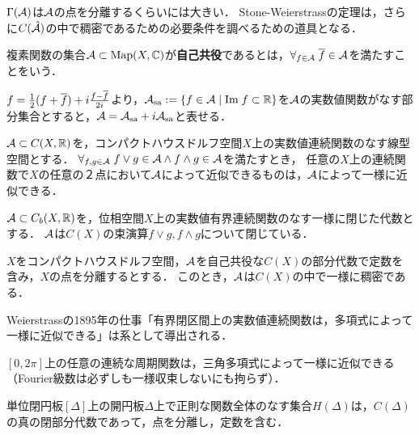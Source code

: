 \documentclass[uplatex,dvipdfmx]{jsreport}
\begin{document}
\begin{tcolorbox}[colframe=ForestGreen, colback=ForestGreen!10!white,breakable,colbacktitle=ForestGreen!40!white,coltitle=black,fonttitle=\bfseries\sffamily,
title=]
    $\Gamma(\mathcal{A})$は$\mathcal{A}$の点を分離するくらいには大きい．
    Stone-Weierstrassの定理は，さらに$C(\hat{\mathcal{A}})$の中で稠密であるための必要条件を調べるための道具となる．
\end{tcolorbox}

\begin{definition}
    複素関数の集合$\mathcal{A}\subset\mathrm{Map}(X,\mathbb{C})$が\textbf{自己共役}であるとは，$\forall_{f\in\mathcal{A}}\;\overline{f}\in\mathcal{A}$を満たすことをいう．
\end{definition}
\begin{remarks}
    $f=\frac{1}{2}(f+\overline{f})+i\frac{f-\overline{f}}{2i}$より，$\mathcal{A}_{\mathrm{sa}}:=\left\{f\in\mathcal{A}\mid\mathrm{Im}\; f\subset\mathbb{R}\right\}$を$\mathcal{A}$の実数値関数がなす部分集合とすると，$\mathcal{A}=\mathcal{A}_{\mathrm{sa}}+i\mathcal{A}_{\mathrm{sa}}$と表せる．
\end{remarks}

\begin{lemma}
    $\mathcal{A}\subset C(X,\mathbb{R})$を，コンパクトハウスドルフ空間$X$上の実数値連続関数のなす線型空間とする．
    $\forall_{f,g\in\mathcal{A}}\;f\lor g\in\mathcal{A}\land f\land g\in\mathcal{A}$を満たすとき，
    任意の$X$上の連続関数で$X$の任意の２点において$\mathcal{A}$によって近似できるものは，$\mathcal{A}$によって一様に近似できる．
\end{lemma}

\begin{lemma}
    $\mathcal{A}\subset C_b(X,\mathbb{R})$を，位相空間$X$上の実数値有界連続関数のなす一様に閉じた代数とする．
    $\mathcal{A}$は$C(X)$の束演算$f\lor g,f\land g$について閉じている．
\end{lemma}

\begin{theorem}[Stone (1948)]
    $X$をコンパクトハウスドルフ空間，$\mathcal{A}$を自己共役な$C(X)$の部分代数で定数を含み，$X$の点を分離するとする．
    このとき，$\mathcal{A}$は$C(X)$の中で一様に稠密である．
\end{theorem}
\begin{remark}
    Weierstrassの1895年の仕事「有界閉区間上の実数値連続関数は，多項式によって一様に近似できる」は系として導出される．
\end{remark}
\begin{example}
    $[0,2\pi]$上の任意の連続な周期関数は，三角多項式によって一様に近似できる（Fourier級数は必ずしも一様収束しないにも拘らず）．
\end{example}
\begin{example}[Rungeの近似定理]
    単位閉円板$[\Delta]$上の開円板$\Delta$上で正則な関数全体のなす集合$H(\Delta)$は，$C(\Delta)$の真の閉部分代数であって，点を分離し，定数を含む．
\end{example}
\end{document}
